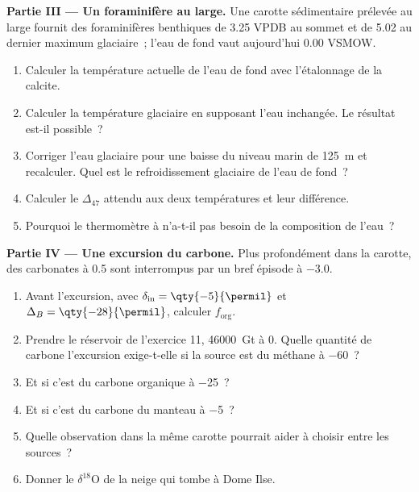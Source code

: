 \begin{problem}
\medskip\noindent\textbf{Partie III --- Un foraminifère au large.} Une
carotte sédimentaire prélevée au large fournit des foraminifères benthiques de \qty{3.25}{\permil}
VPDB au sommet et de \qty{5.02}{\permil} au dernier maximum glaciaire~; l'eau de fond
vaut aujourd'hui \qty{0.00}{\permil} VSMOW.
\begin{enumerate}[resume]
\item Calculer la température actuelle de l'eau de fond avec l'étalonnage
de la calcite.
\item Calculer la température glaciaire en supposant l'eau inchangée. Le
résultat est-il possible~?
\item Corriger l'eau glaciaire pour une baisse du niveau marin de \qty{125}{m} et
recalculer. Quel est le refroidissement glaciaire de l'eau de fond~?
\item Calculer le $\Delta_{47}$ attendu aux deux températures et leur
différence.
\item Pourquoi le thermomètre à  n'a-t-il pas besoin de la
composition de l'eau~?
\end{enumerate}

\medskip\noindent\textbf{Partie IV --- Une excursion du carbone.} Plus profondément dans la
carotte, des carbonates à \qty{+0.5}{\permil} sont interrompus par un
bref épisode à \qty{-3.0}{\permil}.
\begin{enumerate}[resume]
\item Avant l'excursion, avec $\delta_{\mathrm{in}} = \qty{-5}{\permil}$ et
$\Delta_B = \qty{-28}{\permil}$, calculer $f_{\mathrm{org}}$.
\item Prendre le réservoir de l'exercice 11, \qty{46000}{Gt} à 0. Quelle quantité de
carbone l'excursion exige-t-elle si la source est du méthane à \qty{-60}{\permil}~?
\item Et si c'est du carbone organique à \qty{-25}{\permil}~?
\item Et si c'est du carbone du manteau à \qty{-5}{\permil}~?
\item Quelle observation dans la même carotte pourrait aider à choisir entre les
sources~?
\item Donner le $\delta^{18}\mathrm O$ de la neige qui tombe à Dome Ilse.
\end{enumerate}
\end{problem}
